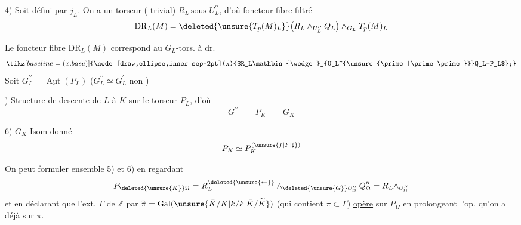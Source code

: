 4) Soit  \uline{défini} par $j_L$. On a un torseur   ( trivial) \(\boxed{R_L\ \text{sous } U_L^{\prime\prime}}\), d’où  foncteur fibre filtré
\[
\mathrm{DR}_L(M)=\deleted{\unsure{T_p(M)_L}}\bigl(R_L\mathbin{\wedge}_{U_L^{\prime\prime}}Q_L\bigr)\mathbin{\wedge}_{G_L}T_p(M)_L
\]

 Le foncteur fibre $\mathrm{DR}_L(M)$ correspond au $G_L$-tors. à dr.
\[
\tikz[baseline=(x.base)]{\node[draw,ellipse,inner sep=2pt](x){$R_L\mathbin{\wedge}_{U_L^{\unsure{\prime|\prime\prime}}}Q_L=P_L$};}
\]
Soit $G_L^{\prime\prime}=\underline{\operatorname{Aut}}(P_L)$ \qquad ($G_L^{\prime\prime}\simeq G_L^{\prime}$ non )

\reversemarginpar{}) \uline{Structure de descente} de $L$ à $K$ \uline{sur le torseur} $P_L$, d’où
\[
G^{\prime\prime}\qquad P_K\qquad G_K
\]

6) $G_K$-Isom donné
\[
P_K\simeq P_K^{(\unsure{f|F|\sharp})}
\]

On peut formuler ensemble 5) et 6) en regardant
\[
P_{\deleted{\unsure{K}}\Omega}=R_L^{\deleted{\unsure{\leftarrow}}}\mathbin{\wedge}_{\deleted{\unsure{G}}U_\Omega^{\prime\prime}}Q_{\Omega}^{\prime\prime}=R_L\mathbin{\wedge}_{U_\Omega^{\prime\prime}}
\]
et en déclarant que l’ext. $\Gamma$ de $\mathbb Z$ par $\widetilde\pi=\operatorname{Gal}(\unsure{\bar K/K|\bar k/k|\bar K/\widetilde K})$ (qui contient $\pi\subset\Gamma$) \uline{opère} sur $P_\Omega$ en prolongeant l’op. qu’on a déjà sur $\pi$.
